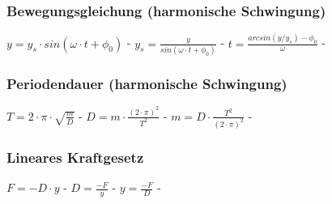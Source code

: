 \subsubsection{Bewegungsgleichung (harmonische Schwingung)} 
\begin{minipage}{0.45\textwidth} 
\end{minipage} 
\begin{minipage}{0.45\textwidth} 
 
\legende{}\end{minipage} 
 
$ y = y_{s} \cdot sin(\omega \cdot t+\phi _{0} ) $ - $ y_{s} = \frac{    y}{sin(\omega \cdot t+\phi _{0} )} $ - $ t = \frac{arcsin(y/y_{s} )-\phi _{0} }{    \omega } $ - \\ 
 
\subsubsection{Periodendauer (harmonische Schwingung)} 
\begin{minipage}{0.45\textwidth} 
\end{minipage} 
\begin{minipage}{0.45\textwidth} 
 
\legende{}\end{minipage} 
 
$ T = 2\cdot \pi \cdot \sqrt{\frac{m}{D}} $ - $ D= m\cdot \frac{(2\cdot \pi )^{2} }{  T^{2} } $ - $ m= D\cdot \frac{ T^{2} }{(2\cdot \pi )^{2} } $ - \\ 
 
\subsubsection{Lineares Kraftgesetz} 
\begin{minipage}{0.45\textwidth} 
\end{minipage} 
\begin{minipage}{0.45\textwidth} 
 
\legende{}\end{minipage} 
 
$ F = -D\cdot y $ - $ D = \frac{-F}{y} $ - $ y = \frac{-F}{D} $ - \\ 
 
